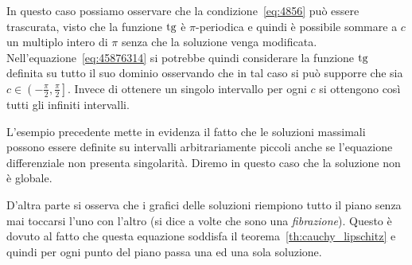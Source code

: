 \begin{example}
In questo caso possiamo osservare che la condizione~\eqref{eq:4856} può essere
trascurata, visto che la funzione $\operatorname{tg}$ è $\pi$-periodica e quindi
è possibile sommare a $c$ un multiplo intero di $\pi$ senza che la soluzione
venga modificata.
Nell'equazione~\eqref{eq:45876314} si potrebbe
quindi considerare la funzione $\operatorname{tg}$
definita su tutto il suo dominio osservando che in tal caso si può
supporre che sia $c\in \left(-\frac \pi 2, \frac \pi 2\right]$.
Invece di ottenere un singolo intervallo per ogni $c$ si ottengono così
tutti gli infiniti intervalli.
\end{example}

\begin{remark}
L'esempio precedente mette in evidenza il fatto che le soluzioni massimali possono essere definite
su intervalli arbitrariamente piccoli anche se l'equazione differenziale
non presenta singolarità. Diremo in questo caso che
la soluzione non è globale.

D'altra parte si osserva che i grafici delle soluzioni riempiono tutto il piano senza 
mai toccarsi l'uno con l'altro (si dice a volte che sono una \emph{fibrazione}).
Questo è dovuto al fatto che questa equazione soddisfa il 
teorema~\ref{th:cauchy_lipschitz} e quindi per ogni punto 
del piano passa una ed una sola soluzione.
\end{remark}

